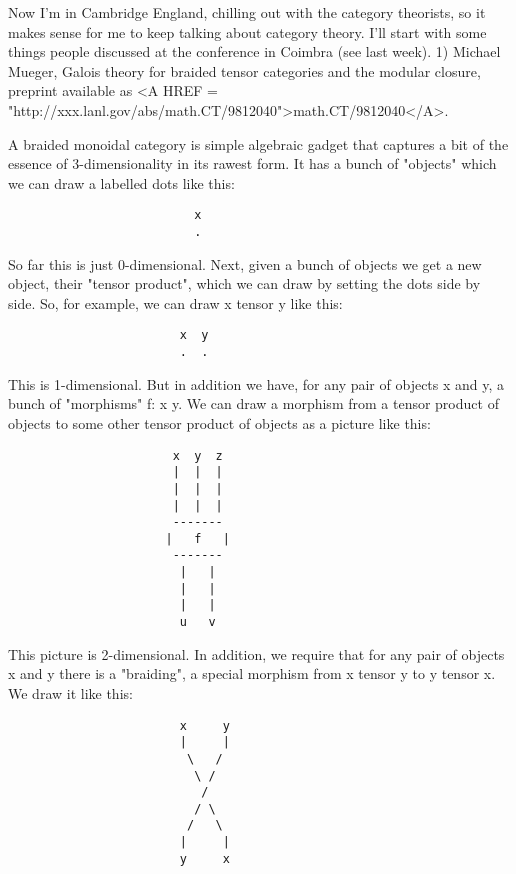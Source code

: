 

Now I'm in Cambridge England, chilling out with the category theorists, 
so it makes sense for me to keep talking about category theory.  I'll 
start with some things people discussed at the conference in Coimbra 
(see last week).  
1) Michael Mueger, Galois theory for braided tensor categories 
and the modular closure, preprint available as <A HREF = "http://xxx.lanl.gov/abs/math.CT/9812040">math.CT/9812040</A>.

A braided monoidal category is simple algebraic gadget that captures
a bit of the essence of 3-dimensionality in its rawest form.  It
has a bunch of "objects" which we can draw a labelled dots like
this:
\begin{verbatim}
                          x
                          .   
\end{verbatim}
    
So far this is just 0-dimensional.  Next, given a bunch of objects 
we get a new object, their "tensor product", which we can draw by setting 
the dots side by side.  So, for example, we can draw x tensor y like this:

\begin{verbatim}
                        x  y
                        .  .
\end{verbatim}
    
This is 1-dimensional.  But in addition we have, for any pair of 
objects x and y, a bunch of "morphisms" f: x \to  y.  We can draw a
morphism from a tensor product of objects to some other tensor
product of objects as a picture like this:
\begin{verbatim}
                       x  y  z
                       |  |  |
                       |  |  |
                       |  |  |
                       -------
                      |   f   |
                       -------
                        |   |   
                        |   |   
                        |   |   
                        u   v   
\end{verbatim}
    
This picture is 2-dimensional.  In addition, we require that for any 
pair of objects x and y there is a "braiding", a special morphism 
from x tensor y to y tensor x.  We draw it like this:
\begin{verbatim}
                        x     y
                        |     |
                         \   /
                          \ /
                           /
                          / \
                         /   \
                        |     |
                        y     x
\end{verbatim}
    
